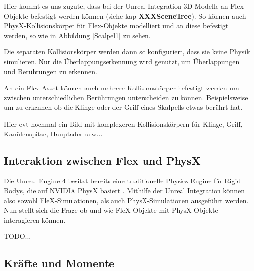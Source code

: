 Hier kommt es uns zugute, dass bei der Unreal Integration 3D-Modelle an Flex-Objekte befestigt werden können (siehe kap \textbf{XXXSceneTree}). So können auch PhysX-Kollisionskörper für Flex-Objekte modelliert und an diese befestigt werden, so wie in Abbildung \ref{Scalpel1} zu sehen.


Die separaten Kollisionskörper werden dann so konfiguriert, dass sie keine Physik simulieren. Nur die Überlappungserkennung wird genutzt, um Überlappungen und Berührungen zu erkennen.

An ein Flex-Asset können auch mehrere Kollisionskörper befestigt werden um zwischen unterschiedlichen Berührungen unterscheiden zu können. Beispielsweise um zu erkennen ob die Klinge oder der Griff eines Skalpells etwas berührt hat.

Hier evt nochmal ein Bild mit komplexeren Kollisionskörpern für Klinge, Griff, Kanülenspitze, Hauptader usw...

  
\subsection{Interaktion zwischen Flex und PhysX}


 
Die Unreal Engine 4 besitzt bereits eine traditionelle Physics Engine für Rigid Bodys, die auf NVIDIA PhysX basiert \cite{ue4physics}. Mithilfe der Unreal Integration können also sowohl FleX-Simulationen, als auch PhysX-Simulationen ausgeführt werden. Nun stellt sich die Frage ob und wie FleX-Objekte mit PhysX-Objekte interagieren können.

TODO...

\subsection{Kräfte und Momente}

